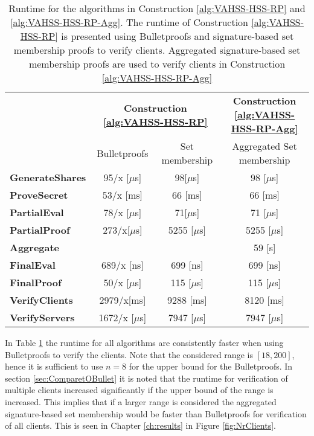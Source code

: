  \begin{table}[h]
\centering
\begin{tabular}{l  c c c}

&   \multicolumn{2}{c}{\textbf{ Construction \ref{alg:VAHSS-HSS-RP}}}    &	\textbf{Construction \ref{alg:VAHSS-HSS-RP-Agg}}	\\ 
    																	& Bulletproofs  & Set membership & Aggregated Set membership\\	\toprule
  \textbf{GenerateShares}				  					&95/x [$\mu$s]			 &98[$\mu$s]  &98 [$\mu$s]												\\ 
  \textbf{ProveSecret} 						&53/x [ms]				& 	66 [ms]	&66 [ms]			\\ 
  \textbf{PartialEval}  										&   78/x	[$\mu$s]				&71[$\mu$s]	 		&	71	 [$\mu$s]							\\ 
  \textbf{PartialProof} 									&   273/x[$\mu$s]						& 5255 [$\mu$s]			& 5255 [$\mu$s]				\\ 
   \textbf{Aggregate}										&   				&			&		59 [s]					\\ 
  \textbf{FinalEval}  											&   689/x [ns]						&699  [ns]				&			699  [ns]												\\ 
  \textbf{FinalProof}  												&   50/x	[$\mu$s]			&  115 [$\mu$s]	&				115 [$\mu$s]									\\ 
  \textbf{VerifyClients}							  							&   2979/x[ms]					& 9288 [ms]&					8120 [ms]							\\ 
  \textbf{VerifyServers}											&   1672/x [$\mu$s]					&		7947 [$\mu$s] 	&		7947 [$\mu$s]					\\ 
  \bottomrule
\end{tabular}
\caption{Runtime for the algorithms in Construction \ref{alg:VAHSS-HSS-RP} and \ref{alg:VAHSS-HSS-RP-Agg}. The runtime of Construction \ref{alg:VAHSS-HSS-RP} is presented using Bulletproofs and signature-based set membership proofs to verify clients.  Aggregated signature-based set membership proofs are used to verify clients in Construction \ref{alg:VAHSS-HSS-RP-Agg}}
\label{tab:BenchBP}
\end{table}

In Table \ref{tab:BenchBP} the runtime for all algorithms are  consistently faster when using Bulletproofs to verify the clients. Note that the considered range is $[18,200]$, hence it is sufficient to use $n=8$ for the upper bound for the Bulletproofs. In section \ref{sec:ComparetOBullet} it is noted that the runtime for verification of multiple clients increased significantly if the upper bound of the range is increased. This implies that if a larger range is considered the aggregated signature-based set membership would be faster than Bulletproofs for verification of all clients. This is seen in Chapter \ref{ch:results} in Figure \ref{fig:NrClients}. 

